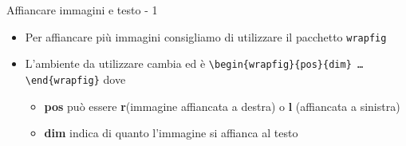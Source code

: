 \begin{frame}{Affiancare immagini e testo - 1}


\begin{itemize}
	\item Per affiancare più immagini consigliamo di utilizzare il pacchetto 
	\texttt{wrapfig}
	\item L'ambiente da utilizzare cambia ed è
	\texttt{\textbackslash{}begin\{wrapfig\}\{pos\}\{dim\}
	\dots{}\textbackslash{}end\{wrapfig\}} dove
	\begin{itemize}
		\item \textbf{pos} può essere \textbf{r}(immagine affiancata a destra)
		o \textbf{l} (affiancata a sinistra)
		\item \textbf{dim} indica di quanto l'immagine si affianca al testo
	\end{itemize}
\end{itemize}

\end{frame}